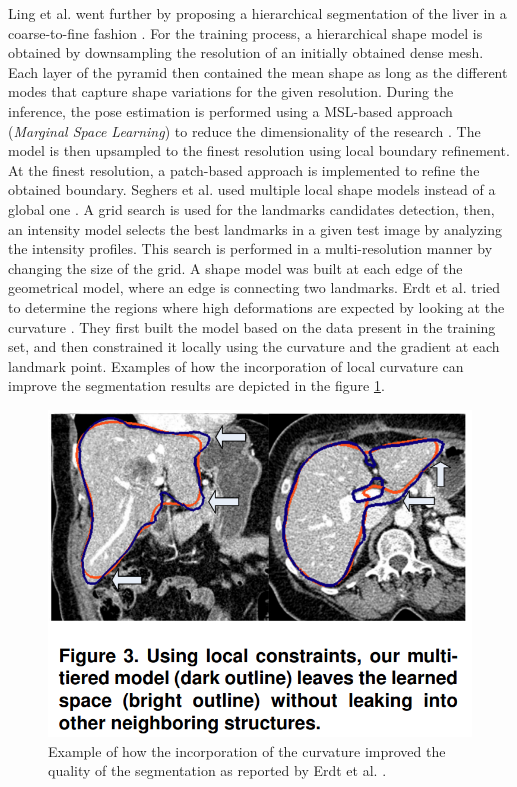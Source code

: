 \documentclass[]{article}
\begin{document}
Ling et al. went further by proposing a hierarchical segmentation of
the liver in a coarse-to-fine fashion \cite{Ling2008}. For the training process, a
hierarchical shape model is obtained by downsampling the resolution of
an initially obtained dense mesh. Each layer of the pyramid then
contained the mean shape as long as the different modes that capture
shape variations for the given resolution. During the inference, the
pose estimation is performed using a MSL-based  approach (\emph{Marginal Space Learning}) to reduce the
dimensionality of the research \cite{Zheng2007}. The model is then upsampled to the
finest resolution using local boundary refinement. At the finest
resolution, a patch-based approach is implemented to refine the obtained
boundary.
Seghers et al. used multiple local shape models instead of a global one \cite{Seghers2007}.
A grid search is used for the landmarks candidates detection, then, an
intensity model selects the best landmarks in a given test image by
analyzing the intensity profiles. This search is performed in a
multi-resolution manner by changing the size of the grid. A shape model
was built at each edge of the geometrical model, where an edge is
connecting two landmarks.
Erdt et al. tried to determine the regions where high deformations
are expected by looking at the curvature \cite{Erdt2010}. They first built the model
based on the data present in the training set, and then constrained it
locally using the curvature and the gradient at each landmark point.
Examples of how the incorporation of local curvature can improve the
segmentation results are depicted in the figure \ref{Erdt2010_Fig3}.

\begin{figure}[th!]
	\centering
	\includegraphics[width=0.7\linewidth]{images/image33}
	\caption{Example of how the incorporation of the curvature improved the quality of the segmentation as reported by Erdt et al. \cite{Erdt2010}.}
	\label{Erdt2010_Fig3}
\end{figure}
\end{document}
